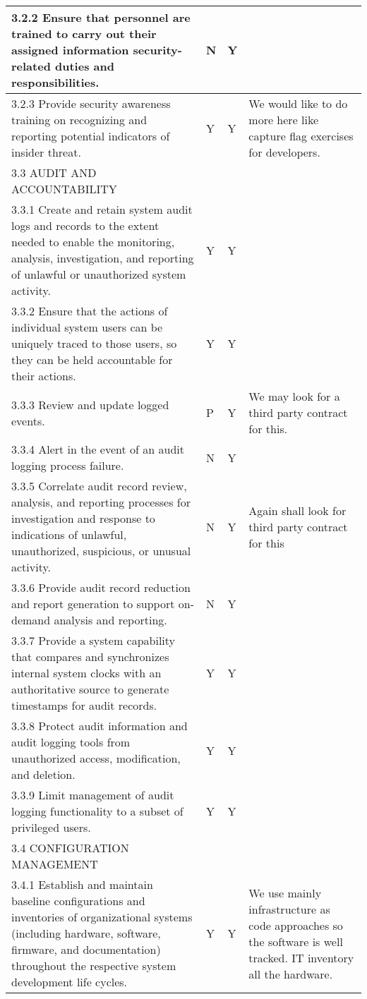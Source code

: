 \begin{longtable} {|p{}|p{}|p{}|p{} |}
{3.2.2 Ensure that personnel are trained to carry out their assigned information security-related duties and responsibilities.}&{N}&{Y}& \\ \hline
{3.2.3 Provide security awareness training on recognizing and reporting potential indicators of insider threat.}&{Y}&{Y}&{We would like to do more here like capture flag exercises for developers. } \\ \hline
{3.3 AUDIT AND ACCOUNTABILITY}&&& \\ \hline
{3.3.1 Create and retain system audit logs and records to the extent needed to enable the monitoring, analysis, investigation, and reporting of unlawful or unauthorized system activity.}&{Y}&{Y}& \\ \hline
{3.3.2 Ensure that the actions of individual system users can be uniquely traced to those users, so they can be held accountable for their actions.}&{Y}&{Y}& \\ \hline
{3.3.3 Review and update logged events.}&{P}&{Y}&{We may look for a third party contract for this.} \\ \hline
{3.3.4 Alert in the event of an audit logging process failure.}&{N}&{Y}& \\ \hline
{3.3.5 Correlate audit record review, analysis, and reporting processes for investigation and response to indications of unlawful, unauthorized, suspicious, or unusual activity.}&{N}&{Y}&{Again shall look for third party contract for this} \\ \hline
{3.3.6 Provide audit record reduction and report generation to support on-demand analysis and reporting.}&{N}&{Y}& \\ \hline
{3.3.7 Provide a system capability that compares and synchronizes internal system clocks with an authoritative source to generate timestamps for audit records.}&{Y}&{Y}& \\ \hline
{3.3.8 Protect audit information and audit logging tools from unauthorized access, modification, and deletion.}&{Y}&{Y}& \\ \hline
{3.3.9 Limit management of audit logging functionality to a subset of privileged users.}&{Y}&{Y}& \\ \hline
{3.4 CONFIGURATION MANAGEMENT}&&& \\ \hline
{3.4.1 Establish and maintain baseline configurations and inventories of organizational systems (including hardware, software, firmware, and documentation) throughout the respective system development life cycles.}&{Y}&{Y}&{We use mainly infrastructure as code approaches so the software is well tracked. IT inventory all the hardware. } \\ \hline

\end{longtable}
